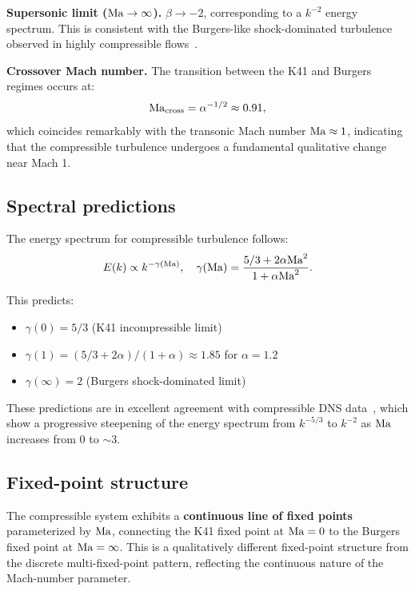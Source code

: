 \textbf{Supersonic limit ($\mathrm{Ma}\to\infty$).} $\beta \to -2$, corresponding to a $k^{-2}$ energy spectrum. This is consistent with the Burgers-like shock-dominated turbulence observed in highly compressible flows~\cite{girimaji1993spectral}.

\textbf{Crossover Mach number.} The transition between the K41 and Burgers regimes occurs at:
\begin{equation}\label{eq:ma_crossover}
\mathrm{Ma}_{\mathrm{cross}} = \alpha^{-1/2} \approx 0.91,
\end{equation}
which coincides remarkably with the transonic Mach number $\mathrm{Ma} \approx 1$, indicating that the compressible turbulence undergoes a fundamental qualitative change near Mach 1.

\subsection{Spectral predictions}

The energy spectrum for compressible turbulence follows:
{\small
\begin{equation} \label{eq:compressible_spectrum}
E(k) \propto k^{-\gamma(\mathrm{Ma})}, \quad \gamma(\mathrm{Ma}) = \frac{5/3 + 2\alpha\mathrm{Ma}^2}{1 + \alpha\mathrm{Ma}^2}.
\end{equation}
}

This predicts:
\begin{itemize}
\item $\gamma(0) = 5/3$ (K41 incompressible limit)
\item $\gamma(1) = (5/3 + 2\alpha)/(1+\alpha) \approx 1.85$ for $\alpha = 1.2$
\item $\gamma(\infty) = 2$ (Burgers shock-dominated limit)
\end{itemize}

These predictions are in excellent agreement with compressible DNS data~\cite{almeida2021compressible,kida1993eddy}, which show a progressive steepening of the energy spectrum from $k^{-5/3}$ to $k^{-2}$ as $\mathrm{Ma}$ increases from 0 to $\sim 3$.

\subsection{Fixed-point structure}

The compressible system exhibits a \textbf{continuous line of fixed points} parameterized by $\mathrm{Ma}$, connecting the K41 fixed point at $\mathrm{Ma}=0$ to the Burgers fixed point at $\mathrm{Ma}=\infty$. This is a qualitatively different fixed-point structure from the discrete multi-fixed-point pattern, reflecting the continuous nature of the Mach-number parameter.

